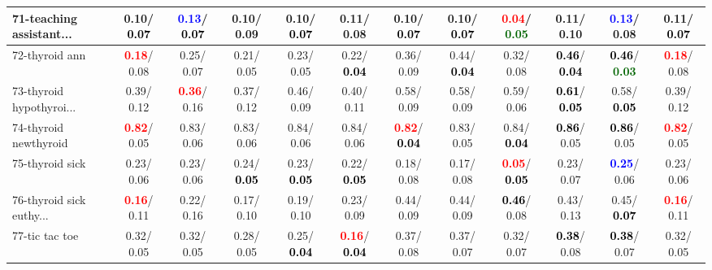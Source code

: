 \begin{table}[h]
\begin{center}
{\begin{tabular}{lc|c|c|c|c|c|c|c|c|c|c}
71-teaching assistant... &   0.10/\textcolor{black}{\textbf{  0.07}} & \textcolor{blue}{\textbf{  0.13}}/\textcolor{black}{\textbf{  0.07}} &   0.10/  0.09 &   0.10/\textcolor{black}{\textbf{  0.07}} &   0.11/  0.08 &   0.10/\textcolor{black}{\textbf{  0.07}} &   0.10/\textcolor{black}{\textbf{  0.07}} & \textcolor{red}{\textbf{  0.04}}/\textcolor{darkgreen}{\textbf{  0.05}} &   0.11/  0.10 & \textcolor{blue}{\textbf{  0.13}}/  0.08 &   0.11/\textcolor{black}{\textbf{  0.07}} \\ \hline
72-thyroid ann & \textcolor{red}{\textbf{  0.18}}/  0.08 &   0.25/  0.07 &   0.21/  0.05 &   0.23/  0.05 &   0.22/\textcolor{black}{\textbf{  0.04}} &   0.36/  0.09 &   0.44/\textcolor{black}{\textbf{  0.04}} &   0.32/  0.08 & \textcolor{black}{\textbf{  0.46}}/\textcolor{black}{\textbf{  0.04}} & \textcolor{black}{\textbf{  0.46}}/\textcolor{darkgreen}{\textbf{  0.03}} & \textcolor{red}{\textbf{  0.18}}/  0.08 \\
73-thyroid hypothyroi... &   0.39/  0.12 & \textcolor{red}{\textbf{  0.36}}/  0.16 &   0.37/  0.12 &   0.46/  0.09 &   0.40/  0.11 &   0.58/  0.09 &   0.58/  0.09 &   0.59/  0.06 & \textcolor{black}{\textbf{  0.61}}/\textcolor{black}{\textbf{  0.05}} &   0.58/\textcolor{black}{\textbf{  0.05}} &   0.39/  0.12 \\
74-thyroid newthyroid & \textcolor{red}{\textbf{  0.82}}/  0.05 &   0.83/  0.06 &   0.83/  0.06 &   0.84/  0.06 &   0.84/  0.06 & \textcolor{red}{\textbf{  0.82}}/\textcolor{black}{\textbf{  0.04}} &   0.83/  0.05 &   0.84/\textcolor{black}{\textbf{  0.04}} & \textcolor{black}{\textbf{  0.86}}/  0.05 & \textcolor{black}{\textbf{  0.86}}/  0.05 & \textcolor{red}{\textbf{  0.82}}/  0.05 \\
75-thyroid sick &   0.23/  0.06 &   0.23/  0.06 &   0.24/\textcolor{black}{\textbf{  0.05}} &   0.23/\textcolor{black}{\textbf{  0.05}} &   0.22/\textcolor{black}{\textbf{  0.05}} &   0.18/  0.08 &   0.17/  0.08 & \textcolor{red}{\textbf{  0.05}}/\textcolor{black}{\textbf{  0.05}} &   0.23/  0.07 & \textcolor{blue}{\textbf{  0.25}}/  0.06 &   0.23/  0.06 \\
76-thyroid sick euthy... & \textcolor{red}{\textbf{  0.16}}/  0.11 &   0.22/  0.16 &   0.17/  0.10 &   0.19/  0.10 &   0.23/  0.09 &   0.44/  0.09 &   0.44/  0.09 & \textcolor{black}{\textbf{  0.46}}/  0.08 &   0.43/  0.13 &   0.45/\textcolor{black}{\textbf{  0.07}} & \textcolor{red}{\textbf{  0.16}}/  0.11 \\
77-tic tac toe &   0.32/  0.05 &   0.32/  0.05 &   0.28/  0.05 &   0.25/\textcolor{black}{\textbf{  0.04}} & \textcolor{red}{\textbf{  0.16}}/\textcolor{black}{\textbf{  0.04}} &   0.37/  0.08 &   0.37/  0.07 &   0.32/  0.07 & \textcolor{black}{\textbf{  0.38}}/  0.08 & \textcolor{black}{\textbf{  0.38}}/  0.07 &   0.32/  0.05 \\

\end{tabular}}
\end{center}
\end{table}
